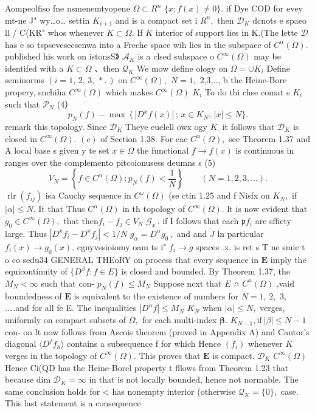 Aompeolfiso fne nsmenemtyopene $\Omega\subset R^{n}$ $\{x;f(x)\neq0\}.$ if Dye COD for evey mt-ne J" wy…o… settin $K_{i+1}$ and is a compact set i $\textstyle R^{n}\!,$ then ${\mathcal{D}}_{K}$ dcnots e spaeo ll / C(KR" whos whenever $K\subset\Omega.$ If $\textstyle K$ interior of support lies in K.(The lette ${\mathcal{D}}$ has e so tspsevesecsenwa into a Freche space wih lies in the subspace of $C^{\alpha}(\Omega).$ published his work on istonsS》 ${\mathcal{A}}_{K}$ is a clsed suhspace o $C^{\infty}(\Omega)$ may be identifed with a $K\subset\Omega$ 、then ${\mathcal{Q}}_{K}$ We mow define ology on $\Omega=\cup K_{i}$ Define seminorms $(i=1,\,2,\,3,\,*.\,)$ on $C^{\infty}(\Omega),$ $N=1,$ 2,3,.., b the Heine-Bore propery, snchiha $C^{\infty}(\Omega)$ which makes $C^{\infty}(\Omega)$ $K_{i}$ To do thi chse comat s $K_{i}$ such that ${\mathcal{P}}_{N}$ (4） $$ p_{N}(f)-\operatorname*{max}\,\{\,|D^{x}f(x)|\,;\,x\in K_{N},\,|x|\leq N\}. $$ remark this topology. Since ${\mathcal{D}}_{K}$ Theye euelell owx ogy $K_{\!\cdot\!}$ it follows that ${\mathcal{D}}_{K}$ is closed in $C^{\infty}(\Omega).$ $\left(c\right)$ of Section 1.38. For cac $C^{\alpha}(\Omega),$ see Theorem 1.37 and A local base s given y te set $x\in\Omega$ the functional $f\to f(x)$ is continuous in ranges over the complemento pitcoionusess deumns s (5) $$ V_{N}=\left\{f\in C^{\alpha}(\Omega)\colon p_{N}(f)<\frac{1}{N}\right\}\qquad(N=1,2,3,\ldots). $$ $\operatorname{rlr}(f_{i j})$ isa Cauchy sequence in $C^{\omega}(\Omega)$ (se ctin 1.25 and f Nisfx on $K_{N},$ if $|\alpha|\leq N.$ It that Thus $C^{\alpha}(\Omega)$ in th topology of $C^{\infty}(\Omega).$ lt is now evident that $g_{0}\in C^{\infty}(\Omega),$ that ${\mathrm{then}}f_{i}-f_{j}\in V_{N}$ ${\mathcal{G}}_{x}\,.$ if $\hat{\boldsymbol{l}}$ follows that each ${\mathfrak{p}}f_{i}$ are sfficty large. Thus $|D^{x}f_{i}-D^{x}f_{j}|<1/N$ $g_{\alpha}=D^{\alpha}g_{0}\,,$ and and ${}\dot{J}$ ln particular $f_{i}(x)\to g_{0}(x).$ cgnyvssioiomy oam ts i" $f_{i}\to g$ spaces .x. is ret s T ne smie t o co sedu34 GENERAL THEoRY on process that every sequence in $\boldsymbol{E}$ imply the equicontinuity of $\{D^{\beta}f\colon f\in E\}$ is closed and bounded. By Theorem 1.37, the $M_{N}<\infty$ such that con- $p_{N}(f)\leq M_{N}$ Suppose ncxt that $E\bumpeq C^{n}(\Omega)$ ,vaid boundedness of $\boldsymbol{E}$ is equivalent to the existence of numbers for $N=1,\,2,$ 3, .….and for all fe E. The inequalities $|D^{\alpha}f|\leq M_{N}$ $K_{N}$ when $|\alpha|\leq N,$ verges, uniformly on compact subsets of $\Omega,$ for each multi-index ${\boldsymbol{\beta}}.$ $K_{N-1},\mathrm{if}\ |\beta|\leq N-1$ con- on lt now follows from Ascois theorem (proved in Appendix A) and Cantor's diagonal $\langle D^{f}f_{h}\rangle$ contains a subsequence {f} for which Hence $(f_{i})$ whenever $\textstyle K$ verges in the topology of $C^{\infty}(\Omega).$ This proves that ${\boldsymbol{E}}$ is compact. ${\mathcal{D}}_{K}$ $C^{\infty}(\Omega)$ Hence Ci(QD has the Heine-Borel property t fllows from Theorem 1.23 that because dim ${\mathcal{D}}_{K}=\infty$ in that is not locally bounded, hence not normable. The same conclusion holds for < has nonempty interior (otherwise ${\mathcal{Q}}_{K}=\{0\},$ case. This last statement is a consequence 